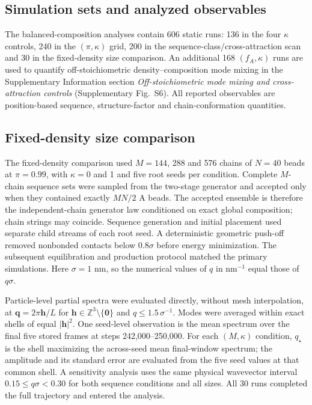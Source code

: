 \documentclass[pdflatex,sn-nature,onecolumn]{sn-jnl}
\begin{document}
\subsection{Simulation sets and analyzed observables}

The balanced-composition analyses contain 606 static runs: 136 in the four $\kappa$ controls, 240 in the $(\pi,\kappa)$ grid, 200 in the sequence-class/cross-attraction scan and 30 in the fixed-density size comparison. An additional 168 $(f_A,\kappa)$ runs are used to quantify off-stoichiometric density--composition mode mixing in the Supplementary Information section \emph{Off-stoichiometric mode mixing and cross-attraction controls} (Supplementary Fig.~S6). All reported observables are position-based sequence, structure-factor and chain-conformation quantities.

\subsection{Fixed-density size comparison}

The fixed-density comparison used $M=144$, 288 and 576 chains of $N=40$ beads at $\pi=0.99$, with $\kappa=0$ and 1 and five root seeds per condition. Complete $M$-chain sequence sets were sampled from the two-stage generator and accepted only when they contained exactly $MN/2$ A beads. The accepted ensemble is therefore the independent-chain generator law conditioned on exact global composition; chain strings may coincide. Sequence generation and initial placement used separate child streams of each root seed. A deterministic geometric push-off removed nonbonded contacts below $0.8\sigma$ before energy minimization. The subsequent equilibration and production protocol matched the primary simulations. Here $\sigma=1$ nm, so the numerical values of $q$ in nm$^{-1}$ equal those of $q\sigma$.

Particle-level partial spectra were evaluated directly, without mesh interpolation, at $\bm q=2\pi\bm h/L$ for $\bm h\in\mathbb Z^3\setminus\{\bm0\}$ and $q\le1.5\,\sigma^{-1}$. Modes were averaged within exact shells of equal $|\bm h|^2$. One seed-level observation is the mean spectrum over the final five stored frames at steps 242,000--250,000. For each $(M,\kappa)$ condition, $q_\star$ is the shell maximizing the across-seed mean final-window spectrum; the amplitude and its standard error are evaluated from the five seed values at that common shell. A sensitivity analysis uses the same physical wavevector interval $0.15\le q\sigma<0.30$ for both sequence conditions and all sizes. All 30 runs completed the full trajectory and entered the analysis.
\end{document}
